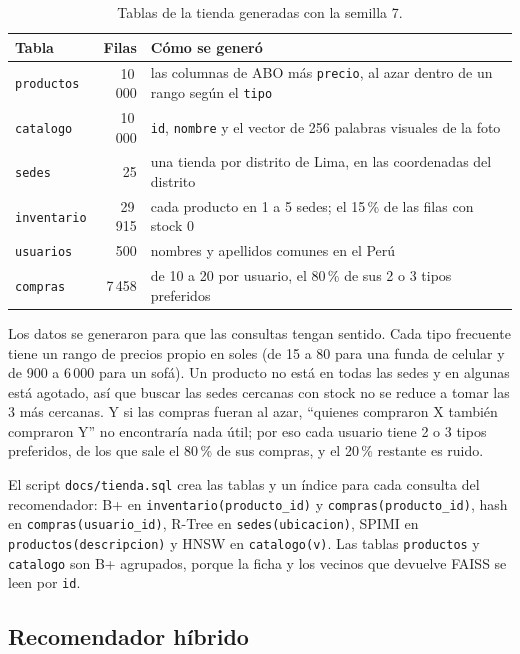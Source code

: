 \documentclass[11pt,a4paper]{article}
\begin{document}
\begin{table}[H]
\centering
\small
\begin{tabular}{lrl}
\toprule
Tabla & Filas & Cómo se generó \\
\midrule
\texttt{productos} & 10\,000 & las columnas de ABO más \texttt{precio}, al azar dentro de un rango según el \texttt{tipo} \\
\texttt{catalogo} & 10\,000 & \texttt{id}, \texttt{nombre} y el vector de 256 palabras visuales de la foto \\
\texttt{sedes} & 25 & una tienda por distrito de Lima, en las coordenadas del distrito \\
\texttt{inventario} & 29\,915 & cada producto en 1 a 5 sedes; el 15\,\% de las filas con stock 0 \\
\texttt{usuarios} & 500 & nombres y apellidos comunes en el Perú \\
\texttt{compras} & 7\,458 & de 10 a 20 por usuario, el 80\,\% de sus 2 o 3 tipos preferidos \\
\bottomrule
\end{tabular}
\caption{Tablas de la tienda generadas con la semilla 7.}
\end{table}

Los datos se generaron para que las consultas tengan sentido. Cada tipo frecuente tiene un rango de precios propio en soles (de 15 a 80 para una funda de celular y de 900 a 6\,000 para un sofá). Un producto no está en todas las sedes y en algunas está agotado, así que buscar las sedes cercanas con stock no se reduce a tomar las 3 más cercanas. Y si las compras fueran al azar, ``quienes compraron X también compraron Y'' no encontraría nada útil; por eso cada usuario tiene 2 o 3 tipos preferidos, de los que sale el 80\,\% de sus compras, y el 20\,\% restante es ruido.

El script \texttt{docs/tienda.sql} crea las tablas y un índice para cada consulta del recomendador: B+ en \texttt{inventario(producto\_id)} y \texttt{compras(producto\_id)}, hash en \texttt{compras(usuario\_id)}, R-Tree en \texttt{sedes(ubicacion)}, SPIMI en \texttt{productos(descripcion)} y HNSW en \texttt{catalogo(v)}. Las tablas \texttt{productos} y \texttt{catalogo} son B+ agrupados, porque la ficha y los vecinos que devuelve FAISS se leen por \texttt{id}.

\subsection{Recomendador híbrido}
\label{sec:recomendador}
\end{document}
